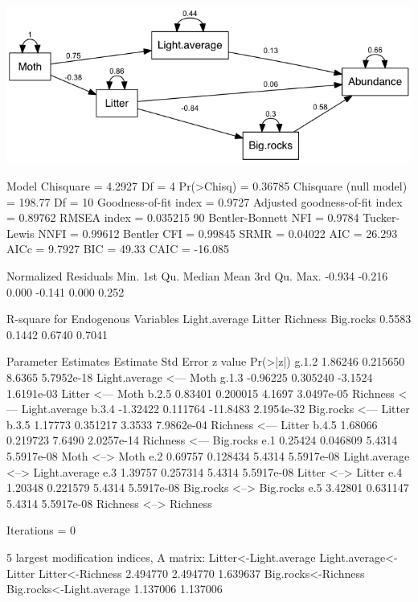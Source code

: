 \documentclass[12pt]{article}
\begin{document}
\includegraphics{semPathA.png}
\pagebreak

\begin{Schunk}
\begin{Soutput}
 Model Chisquare =  4.2927   Df =  4 Pr(>Chisq) = 0.36785
 Chisquare (null model) =  198.77   Df =  10
 Goodness-of-fit index =  0.9727
 Adjusted goodness-of-fit index =  0.89762
 RMSEA index =  0.035215   90%
 Bentler-Bonnett NFI =  0.9784
 Tucker-Lewis NNFI =  0.99612
 Bentler CFI =  0.99845
 SRMR =  0.04022
 AIC =  26.293
 AICc =  9.7927
 BIC =  49.33
 CAIC =  -16.085

 Normalized Residuals
   Min. 1st Qu.  Median    Mean 3rd Qu.    Max. 
 -0.934  -0.216   0.000  -0.141   0.000   0.252 

 R-square for Endogenous Variables
Light.average        Litter      Richness     Big.rocks 
       0.5583        0.1442        0.6740        0.7041 

 Parameter Estimates
      Estimate Std Error z value  Pr(>|z|)                                   
g.1.2  1.86246 0.215650    8.6365 5.7952e-18 Light.average <--- Moth         
g.1.3 -0.96225 0.305240   -3.1524 1.6191e-03 Litter <--- Moth                
b.2.5  0.83401 0.200015    4.1697 3.0497e-05 Richness <--- Light.average     
b.3.4 -1.32422 0.111764  -11.8483 2.1954e-32 Big.rocks <--- Litter           
b.3.5  1.17773 0.351217    3.3533 7.9862e-04 Richness <--- Litter            
b.4.5  1.68066 0.219723    7.6490 2.0257e-14 Richness <--- Big.rocks         
e.1    0.25424 0.046809    5.4314 5.5917e-08 Moth <--> Moth                  
e.2    0.69757 0.128434    5.4314 5.5917e-08 Light.average <--> Light.average
e.3    1.39757 0.257314    5.4314 5.5917e-08 Litter <--> Litter              
e.4    1.20348 0.221579    5.4314 5.5917e-08 Big.rocks <--> Big.rocks        
e.5    3.42801 0.631147    5.4314 5.5917e-08 Richness <--> Richness          

 Iterations =  0 
\end{Soutput}
\begin{Soutput}
 5 largest modification indices, A matrix:
   Litter<-Light.average    Light.average<-Litter         Litter<-Richness 
                2.494770                 2.494770                 1.639637 
     Big.rocks<-Richness Big.rocks<-Light.average 
                1.137006                 1.137006 


\end{Soutput}
\end{Schunk}
\end{document}
